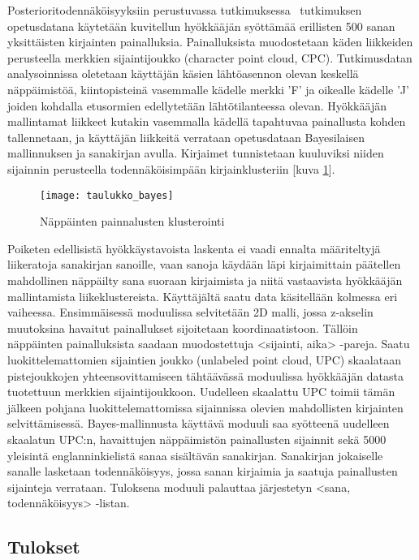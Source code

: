 \documentclass[finnish]{tktltiki2}
\theoremstyle{definition}
\theoremstyle{remark}
\begin{document}
Posterioritodennäköisyyksiin perustuvassa tutkimuksessa~\cite{mole} tutkimuksen opetusdatana käytetään kuvitellun hyökkääjän syöttämää erillisten 500 sanan yksittäisten kirjainten painalluksia. Painalluksista muodostetaan käden liikkeiden perusteella merkkien sijaintijoukko (character point cloud, CPC). Tutkimusdatan analysoinnissa oletetaan käyttäjän käsien lähtöasennon olevan keskellä näppäimistöä, kiintopisteinä vasemmalle kädelle merkki 'F' ja oikealle kädelle 'J' joiden kohdalla etusormien edellytetään lähtötilanteessa olevan. Hyökkääjän mallintamat liikkeet kutakin vasemmalla kädellä tapahtuvaa painallusta kohden tallennetaan, ja käyttäjän liikkeitä verrataan opetusdataan Bayesilaisen mallinnuksen ja sanakirjan avulla. Kirjaimet tunnistetaan kuuluviksi niiden sijainnin perusteella todennäköisimpään kirjainklusteriin [kuva \ref{fig:bayes}].

\begin{figure}[!h]
\centering
\texttt{[image: taulukko\_bayes]}
\caption{Näppäinten painnalusten klusterointi}
\label{fig:bayes}
\end{figure}

Poiketen edellisistä hyökkäystavoista laskenta ei vaadi ennalta määriteltyjä liikeratoja sanakirjan sanoille, vaan sanoja käydään läpi kirjaimittain päätellen mahdollinen näppäilty sana suoraan kirjaimista ja niitä vastaavista hyökkääjän mallintamista liikeklustereista. 
Käyttäjältä saatu data käsitellään kolmessa eri vaiheessa. Ensimmäisessä moduulissa selvitetään 2D malli, jossa z-akselin muutoksina havaitut painallukset sijoitetaan koordinaatistoon. Tällöin näppäinten painalluksista saadaan muodostettuja <sijainti, aika> -pareja. Saatu luokittelemattomien sijaintien joukko (unlabeled point cloud, UPC) skaalataan pistejoukkojen yhteensovittamiseen tähtäävässä moduulissa hyökkääjän datasta tuotettuun merkkien sijaintijoukkoon. Uudelleen skaalattu UPC toimii tämän jälkeen pohjana luokittelemattomissa sijainnissa olevien mahdollisten kirjainten selvittämisessä. 
Bayes-mallinnusta käyttävä moduuli saa syötteenä uudelleen skaalatun UPC:n, havaittujen näppäimistön painallusten sijainnit sekä 5000 yleisintä englanninkielistä sanaa sisältävän sanakirjan. Sanakirjan jokaiselle sanalle lasketaan todennäköisyys, jossa sanan kirjaimia ja saatuja painallusten sijainteja verrataan. Tuloksena moduuli palauttaa järjestetyn <sana, todennäköisyys> -listan.

\subsection{Tulokset}
\end{document}
